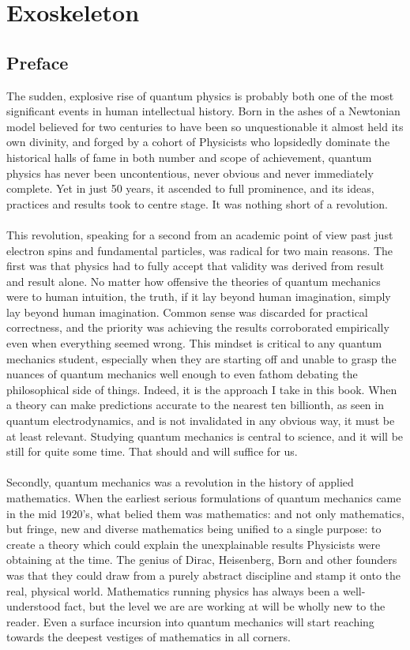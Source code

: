 \chapter{Exoskeleton}
\section{Preface}
The sudden, explosive rise of quantum physics is probably both one of the most significant events in human intellectual history. Born in the ashes of a Newtonian model believed for two centuries to have been so unquestionable it almost held its own divinity, and forged by a cohort of Physicists who lopsidedly dominate the historical halls of fame in both number and scope of achievement, quantum physics has never been uncontentious, never obvious and never immediately complete. Yet in just 50 years, it ascended to full prominence, and its ideas, practices and results took to centre stage. It was nothing short of a revolution.
\\\\
This revolution, speaking for a second from an academic point of view past just electron spins and fundamental particles, was radical for two main reasons. The first was that physics had to fully accept that validity was derived from result and result alone. No matter how offensive the theories of quantum mechanics were to human intuition, the truth, if it lay beyond human imagination, simply lay beyond human imagination. Common sense was discarded for practical correctness, and the priority was achieving the results corroborated empirically even when everything seemed wrong. This mindset is critical to any quantum mechanics student, especially when they are starting off and unable to grasp the nuances of quantum mechanics well enough to even fathom debating the philosophical side of things. Indeed, it is the approach I take in this book. When a theory can make predictions accurate to the nearest ten billionth, as seen in quantum electrodynamics, and is not invalidated in any obvious way, it must be at least relevant. Studying quantum mechanics is central to science, and it will be still for quite some time. That should and will suffice for us.
\\\\
Secondly, quantum mechanics was a revolution in the history of applied mathematics. When the earliest serious formulations of quantum mechanics came in the mid 1920's, what belied them was mathematics: and not only mathematics, but fringe, new and diverse mathematics being unified to a single purpose: to create a theory which could explain the unexplainable results Physicists were obtaining at the time. The genius of Dirac, Heisenberg, Born and other founders was that they could draw from a purely abstract discipline and stamp it onto the real, physical world. Mathematics running physics has always been a well-understood fact, but the level we are are working at will be wholly new to the reader. Even a surface incursion into quantum mechanics will start reaching towards the deepest vestiges of mathematics in all corners.
